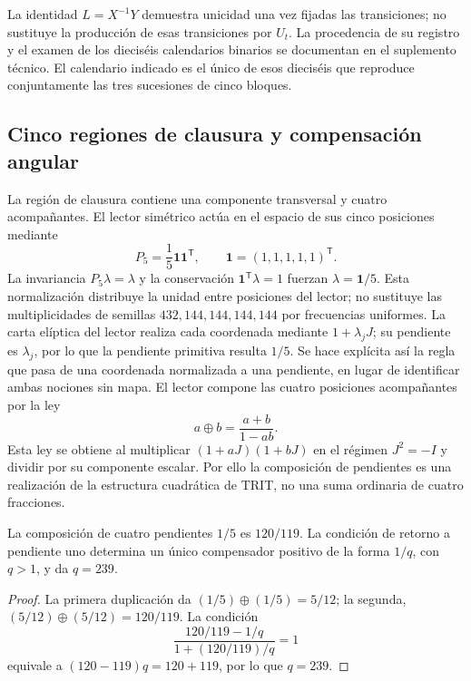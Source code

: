 La identidad \(L=X^{-1}Y\) demuestra unicidad una vez fijadas las transiciones; no sustituye la producción de esas transiciones por \(U_t\). La procedencia de su registro y el examen de los dieciséis calendarios binarios se documentan en el suplemento técnico. El calendario indicado es el único de esos dieciséis que reproduce conjuntamente las tres sucesiones de cinco bloques.

\subsection{Cinco regiones de clausura y compensación angular}

La región de clausura contiene una componente transversal y cuatro acompañantes. El lector simétrico actúa en el espacio de sus cinco posiciones mediante
\[
 P_5=\frac15\mathbf1\mathbf1^{\mathsf T},\qquad
 \mathbf1=(1,1,1,1,1)^{\mathsf T}.
\]
La invariancia \(P_5\lambda=\lambda\) y la conservación \(\mathbf1^{\mathsf T}\lambda=1\) fuerzan \(\lambda=\mathbf1/5\). Esta normalización distribuye la unidad entre posiciones del lector; no sustituye las multiplicidades de semillas \(432,144,144,144,144\) por frecuencias uniformes. La carta elíptica del lector realiza cada coordenada mediante \(1+\lambda_jJ\); su pendiente es \(\lambda_j\), por lo que la pendiente primitiva resulta \(1/5\). Se hace explícita así la regla que pasa de una coordenada normalizada a una pendiente, en lugar de identificar ambas nociones sin mapa. El lector compone las cuatro posiciones acompañantes por la ley
\begin{equation}
 a\oplus b=\frac{a+b}{1-ab}.
 \label{eq:suma-pendientes}
\end{equation}
Esta ley se obtiene al multiplicar \((1+aJ)(1+bJ)\) en el régimen \(J^2=-I\) y dividir por su componente escalar. Por ello la composición de pendientes es una realización de la estructura cuadrática de TRIT, no una suma ordinaria de cuatro fracciones.

\begin{proposition}
La composición de cuatro pendientes \(1/5\) es \(120/119\). La condición de retorno a pendiente uno determina un único compensador positivo de la forma \(1/q\), con \(q>1\), y da \(q=239\).
\end{proposition}
\begin{proof}
La primera duplicación da \((1/5)\oplus(1/5)=5/12\); la segunda, \((5/12)\oplus(5/12)=120/119\). La condición
\[
 \frac{120/119-1/q}{1+(120/119)/q}=1
\]
equivale a \((120-119)q=120+119\), por lo que \(q=239\).
\end{proof}

